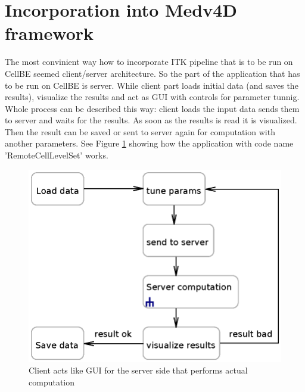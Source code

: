 \section{Incorporation into Medv4D framework}

\par
The most convinient way how to incorporate ITK pipeline that is to be run on CellBE seemed client/server architecture. So the part of the application that has to be run on CellBE is server. While client part loads initial data (and saves the results), visualize the results and act as GUI with controls for parameter tunnig. Whole process can be described this way: client loads the input data sends them to server and waits for the results. As soon as the results is read it is visualized. Then the result can be saved or sent to server again for computation with another parameters. See Figure \ref{fg:computationProcess} showing how the application with code name 'RemoteCellLevelSet' works.

\begin{figure}
    \centering
    \includegraphics[width=\textwidth]{data/computationProcess}
    \caption[RemoteCellLevelSet application computation process]{Client acts like GUI for the server side that performs actual computation}
    \label{fg:computationProcess}
\end{figure}

